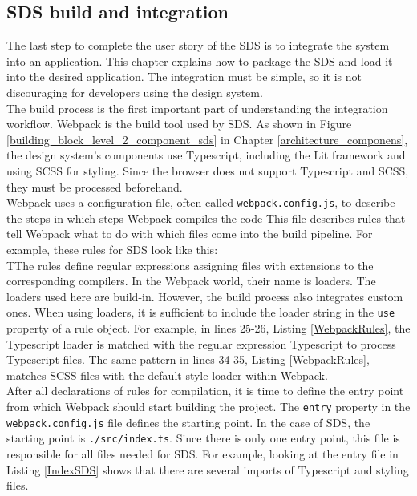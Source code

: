 \subsection{\ac{SDS} build and integration}\label{SDS_build_and_integration}
The last step to complete the user story of the \ac{SDS} is to integrate the system into an application. This chapter explains how to package the \ac{SDS} and load it into the desired application. The integration must be simple, so it is not discouraging for developers using the design system.  \\

The build process is the first important part of understanding the integration workflow. Webpack is the build tool used by \ac{SDS}. As shown in Figure \ref{building_block_level_2_component_sds} in Chapter \ref{architecture_componens}, the design system's components use Typescript, including the Lit framework and using \ac{SCSS} for styling. Since the browser does not support Typescript and \ac{SCSS}, they must be processed beforehand. \\
Webpack uses a configuration file, often called \texttt{webpack.config.js}, to describe the steps in which steps Webpack compiles the code This file describes rules that tell Webpack what to do with which files come into the build pipeline. For example, these rules for \ac{SDS} look like this: \\

TThe rules define regular expressions assigning files with extensions to the corresponding compilers. In the Webpack world, their name is loaders. The loaders used here are build-in. However, the build process also integrates custom ones. When using loaders, it is sufficient to include the loader string in the \texttt{use} property of a rule object. For example, in lines 25-26, Listing \ref{WebpackRules}, the Typescript loader is matched with the regular expression Typescript to process Typescript files. The same pattern in lines 34-35, Listing \ref{WebpackRules}, matches \ac{SCSS} files with the default style loader within Webpack. \\
After all declarations of rules for compilation, it is time to define the entry point from which Webpack should start building the project. The \texttt{entry} property in the \texttt{webpack.config.js} file defines the starting point. In the case of \ac{SDS}, the starting point is \texttt{./src/index.ts}. Since there is only one entry point, this file is responsible for all files needed for \ac{SDS}. For example, looking at the entry file in Listing \ref{IndexSDS} shows that there are several imports of Typescript and styling files. 
